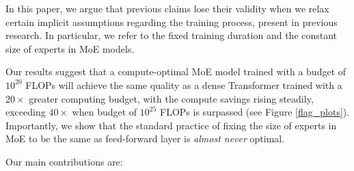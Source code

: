 In this paper, we argue that previous claims lose their validity when we relax certain implicit assumptions regarding the training process, present in previous research. In particular, we refer to the fixed training duration and the constant size of experts in MoE models. %

Our results suggest that a compute-optimal MoE model trained with a budget of $10^{20}$ FLOPs will achieve the same quality as a dense Transformer trained with a \textit{$20\times$} greater computing budget, with the compute savings rising steadily, exceeding \textit{$40\times$} when budget of $10^{25}$ FLOPs is surpassed (see Figure \ref{flag_plots}). Importantly, we show that the standard practice of fixing the size of experts in MoE to be the same as feed-forward layer is \emph{almost never} optimal.

Our main contributions are:

